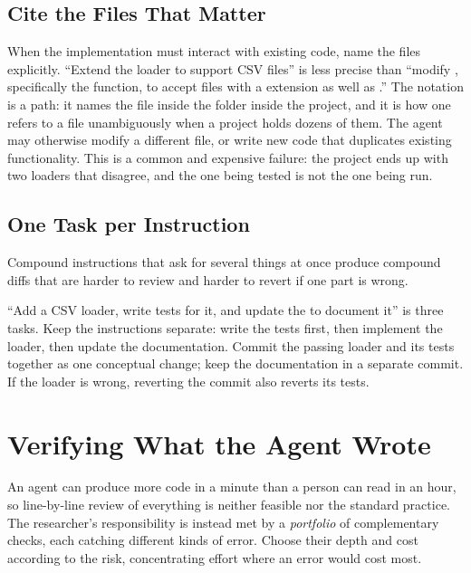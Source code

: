 \subsection{Cite the Files That Matter}

When the implementation must interact with existing code, name the files explicitly.
``Extend the loader to support CSV files'' is less precise than ``modify , specifically the  function, to accept files with a  extension as well as .''
The notation  is a path: it names the file  inside the folder  inside the project, and it is how one refers to a file unambiguously when a project holds dozens of them.
The agent may otherwise modify a different file, or write new code that duplicates existing functionality.
This is a common and expensive failure: the project ends up with two loaders that disagree, and the one being tested is not the one being run.

\subsection{One Task per Instruction}

Compound instructions that ask for several things at once produce compound diffs that are harder to review and harder to revert if one part is wrong.

\begin{remark}
``Add a CSV loader, write tests for it, and update the  to document it'' is three tasks.
Keep the instructions separate: write the tests first, then implement the loader, then update the documentation.
Commit the passing loader and its tests together as one conceptual change; keep the documentation in a separate commit.
If the loader is wrong, reverting the commit also reverts its tests.
\end{remark}

\section{Verifying What the Agent Wrote}
\label{section:Verification}

An agent can produce more code in a minute than a person can read in an hour, so line-by-line review of everything is neither feasible nor the standard practice.
The researcher's responsibility is instead met by a \emph{portfolio} of complementary checks, each catching different kinds of error. Choose their depth and cost according to the risk, concentrating effort where an error would cost most.

